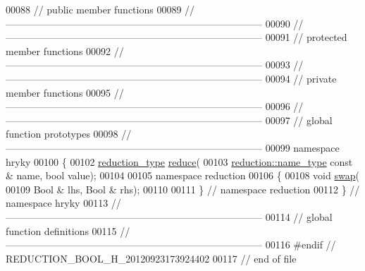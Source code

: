 \begin{DoxyCode}
00088 \textcolor{comment}{// public member functions}
00089 \textcolor{comment}{//
      ------------------------------------------------------------------------------}
00090 \textcolor{comment}{//
      ------------------------------------------------------------------------------}
00091 \textcolor{comment}{// protected member functions}
00092 \textcolor{comment}{//
      ------------------------------------------------------------------------------}
00093 \textcolor{comment}{//
      ------------------------------------------------------------------------------}
00094 \textcolor{comment}{// private member functions}
00095 \textcolor{comment}{//
      ------------------------------------------------------------------------------}
00096 \textcolor{comment}{//
      ------------------------------------------------------------------------------}
00097 \textcolor{comment}{// global function prototypes}
00098 \textcolor{comment}{//
      ------------------------------------------------------------------------------}
00099 \textcolor{keyword}{namespace }hryky
00100 \{
00102     \hyperlink{namespacehryky_a343a9a4c36a586be5c2693156200eadc}{reduction_type} \hyperlink{namespacehryky_af41cb3af6766761da0ff21b84527a52c}{reduce}(
00103         \hyperlink{namespacehryky_1_1reduction_ac686c30a4c8d196bbd0f05629a6b921f}{reduction::name_type} \textcolor{keyword}{const} & name, \textcolor{keywordtype}{bool} value);
00104 
00105 \textcolor{keyword}{namespace }reduction
00106 \{
00108     \textcolor{keywordtype}{void} \hyperlink{namespacehryky_1_1reduction_a493c83efdf5f9e9c49ba77e1b65325a1}{swap}(
00109         Bool & lhs, Bool & rhs);
00110 
00111 \} \textcolor{comment}{// namespace reduction}
00112 \} \textcolor{comment}{// namespace hryky}
00113 \textcolor{comment}{//
      ------------------------------------------------------------------------------}
00114 \textcolor{comment}{// global function definitions}
00115 \textcolor{comment}{//
      ------------------------------------------------------------------------------}
00116 \textcolor{preprocessor}{#endif // REDUCTION\_BOOL\_H\_20120923173924402}
00117 \textcolor{preprocessor}{}\textcolor{comment}{// end of file}
\end{DoxyCode}
